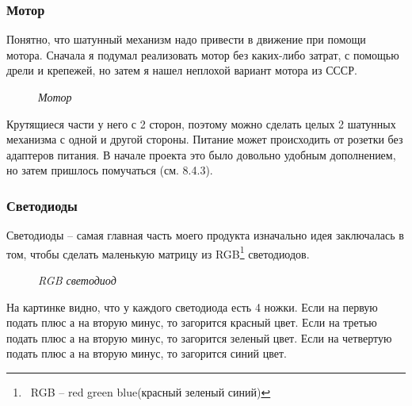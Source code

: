 \documentclass[a4paper, 12pt]{article}
\newcommand{\image}[3]{
	\begin{figure}[ht]
		\center{\texttt{[image: img/\#1]} }
		\caption{\textit{#3}}\end{figure}
}
\begin{document}
\subsubsection{Мотор}

Понятно, что шатунный механизм надо привести в движение
при помощи мотора.
Сначала я подумал реализовать мотор без каких-либо затрат,
с помощью дрели и крепежей, но затем я нашел неплохой вариант
мотора из СССР.

\image{Мотор.jpg}{160}{Мотор}

Крутящиеся части у него с 2 сторон, поэтому можно сделать целых 2 шатунных механизма
с одной и другой стороны. Питание может происходить от розетки без адаптеров питания.
В начале проекта это было довольно удобным дополнением, но затем пришлось помучаться
(см. 8.4.3).

\subsubsection{Светодиоды}

Светодиоды -- самая главная часть моего продукта
изначально идея заключалась в том, чтобы сделать маленькую
матрицу из RGB\footnote{\ RGB -- red green blue(красный зеленый синий)} светодиодов.

\image{Светодиод.png}{140}{RGB светодиод}

На картинке видно, что у каждого светодиода есть 4 ножки. Если на первую подать
плюс а на вторую минус, то загорится красный цвет. Если на третью подать
плюс а на вторую минус, то загорится зеленый цвет. Если на четвертую подать
плюс а на вторую минус, то загорится синий цвет.
\end{document}
